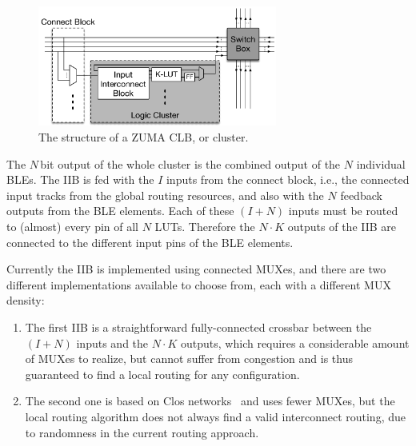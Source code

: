 \documentclass{article}
\begin{document}
\begin{figure}[htbp]
    \centering
    \includegraphics[width=0.7\textwidth]{Figures/ZUMA_CLB}
    \caption{The structure of a ZUMA CLB, or cluster.}
    \label{fig:cluster}
\end{figure}

The \(N\)\,bit output of the whole cluster is the combined output of the \(N\) individual BLEs.
The IIB is fed with the \(I\) inputs from the connect block, i.e., the connected input tracks from the global routing resources, and also with the \(N\) feedback outputs from the BLE elements.
Each of these \({(I+N)}\) inputs must be routed to (almost) every pin of all \(N\) LUTs.
Therefore the \({N \cdot K}\) outputs of the IIB are connected to the different input pins of the BLE elements.

\newpage
Currently the IIB is implemented using connected MUXes, and there are two different implementations available to choose from, each with a different MUX density:
\begin{enumerate}
    \item The first IIB is a straightforward fully-connected crossbar between the \({(I+N)}\) inputs and the \({N \cdot K}\) outputs, which requires a considerable amount of MUXes to realize, but cannot suffer from congestion and is thus guaranteed to find a local routing for any configuration.
    \item The second one is based on Clos networks~\cite{Clos1953Studynonblocking} and uses fewer MUXes, 
    but the local routing algorithm does not always find a valid interconnect routing, due to randomness in the current routing approach.
\end{enumerate}
\end{document}
